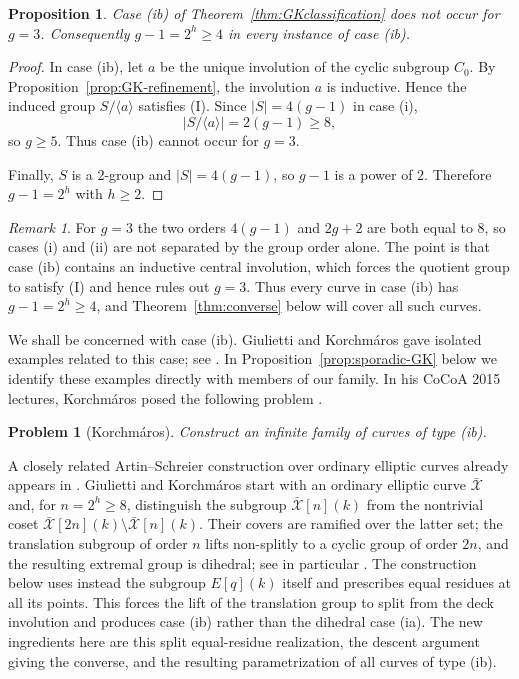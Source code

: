 \documentclass[11pt]{article}
\newtheorem{proposition}[theorem]{Proposition}
\newtheorem{problem}[theorem]{Problem}
\theoremstyle{remark}
\newtheorem{remark}[theorem]{Remark}
\begin{document}
\begin{proposition}\label{prop:no-genus3}
Case \textup{(ib)} of Theorem~\ref{thm:GKclassification} does not occur
for $g=3$.  Consequently $g-1=2^h\ge4$ in every instance of case
\textup{(ib)}.
\end{proposition}

\begin{proof}
In case \textup{(ib)}, let $a$ be the unique involution of the cyclic
subgroup $C_0$.  By Proposition~\ref{prop:GK-refinement}, the involution $a$ is
inductive.  Hence the induced group $S/\langle a\rangle$ satisfies
\textup{(I)}.  Since $|S|=4(g-1)$ in case \textup{(i)},
\[
        |S/\langle a\rangle|=2(g-1)\ge8,
\]
so $g\ge5$.  Thus case \textup{(ib)} cannot occur for $g=3$.

Finally, $S$ is a $2$-group and $|S|=4(g-1)$, so $g-1$ is a power of
$2$.  Therefore $g-1=2^h$ with $h\ge2$.
\end{proof}

\begin{remark}
For $g=3$ the two orders $4(g-1)$ and $2g+2$ are both equal to $8$, so
cases \textup{(i)} and \textup{(ii)} are not separated by the group
order alone.  The point is that case \textup{(ib)} contains an inductive
central involution, which forces the quotient group to satisfy
\textup{(I)} and hence rules out $g=3$.  Thus every curve in case
\textup{(ib)} has $g-1=2^h\ge4$, and Theorem~\ref{thm:converse} below
will cover all such curves.
\end{remark}

We shall be concerned with case \textup{(ib)}.  Giulietti and
Korchm\'aros gave isolated examples related to this case; see
\cite[Sections~6.2 and~6.5]{GK2015}.  In
Proposition~\ref{prop:sporadic-GK} below we identify these examples
directly with members of our family.  In his CoCoA 2015 lectures,
Korchm\'aros posed the following problem
\cite[Problem~11]{KorchmarosSlides}.

\begin{problem}[Korchm\'aros]\label{prob:Korchmaros11}
Construct an infinite family of curves of type \textup{(ib)}.
\end{problem}

A closely related Artin--Schreier construction over ordinary elliptic
curves already appears in \cite[Section~5]{GK2015}.  Giulietti and
Korchm\'aros start with an ordinary elliptic curve $\bar{\mathcal X}$ and,
for $n=2^h\ge8$, distinguish the subgroup
$\bar{\mathcal X}[n](k)$ from the nontrivial coset
$\bar{\mathcal X}[2n](k)\setminus\bar{\mathcal X}[n](k)$.  Their covers
are ramified over the latter set; the translation subgroup of order $n$
lifts non-splitly to a cyclic group of order $2n$, and the resulting
extremal group is dihedral; see in particular
\cite[Proposition~5.12 and Theorem~5.14]{GK2015}.  The construction below
uses instead the subgroup $E[q](k)$ itself and prescribes equal residues at
all its points.  This forces the lift of the translation group to split
from the deck involution and produces case \textup{(ib)} rather than the
dihedral case \textup{(ia)}.  The new ingredients here are this
split equal-residue realization, the descent argument giving the converse,
and the resulting parametrization of all curves of type \textup{(ib)}.
\end{document}
